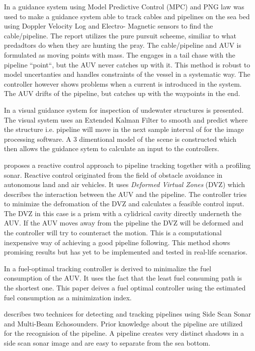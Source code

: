 	In \cite{MPC_pure_pursuit} a guidance system using Model Predictive Control (MPC) and PNG law was used to make 
	a guidance system able to track cables and pipelines on the sea bed using Doppler Velocity Log and Electro-
	Magnetic sensors to find the cable/pipeline. The report utilizes the pure pursuit scheeme, similiar to what 
	predadtors do when they are hunting the pray. The cable/pipeline and AUV is formulated as moving points with 
	mass. The engages in a tail chase with the pipeline ``point``, but the AUV never catches up with it. This 
	method is robust to model uncertanties and handles constraints of the vessel in a systematic way. The controller
	however shows problems when a current is introduced in the system. The AUV drifts of the pipeline, but catches 
	up with the waypoints in the end.
	
	In \cite{Visual_inpsection_of_seabottom_by_AUV} a visual guidance system for inspection of undewater structures 
	is presented. The visual system uses an Extended Kalman Filter to smooth and predict where the structure i.e. 
	pipeline will move in the next sample interval of for the image processing software. A 3 dimentional model 
	of the scene is constructed which then allows the guidance sytem to calculate an input to the controllers.
	
	\cite{reactive_control_AUV} proposes a reactive control approach to pipeline tracking together with a 
	profiling sonar. Reactive control originated from the field of obstacle avoidance in autonomous land and air 
	vehicles. It uses \textit{Deformed Virtual Zones} (DVZ) which describes the interaction between the AUV and 
	the pipeline. The controller tries to minimize the defromation of the DVZ and calculates a feasible control input. 
	The DVZ in this case is a prism with a cylidrical cavity directly underneth the AUV. If the AUV moves away from 
	the pipeline the DVZ will be deformed and the controller will try to counteract the motion. This is a 
	computational inexpensive way of achieving a good pipeline following. This method shows promising results 
	but has yet to be implemented and tested in real-life scenarios. 
	
	In \cite{fuel_optimal_control} a fuel-optimal tracking controller is derived to minimalize the fuel consumption 
	of the AUV. It uses the fact that the least fuel consuming path is the shortest one. This
	paper deives a fuel optimal controller using the estimated fuel consumption as a minimization index. 

	\cite{side_scan_sonar} describes two technices for detecting and tracking pipelines using Side Scan
	Sonar and Multi-Beam Echosounders. Prior knowledge about the pipeline are utilized for the recognision
	of the pipeline. A pipeline creates very distinct shadows in a side scan sonar image and are easy to
	separate from the sea bottom.


